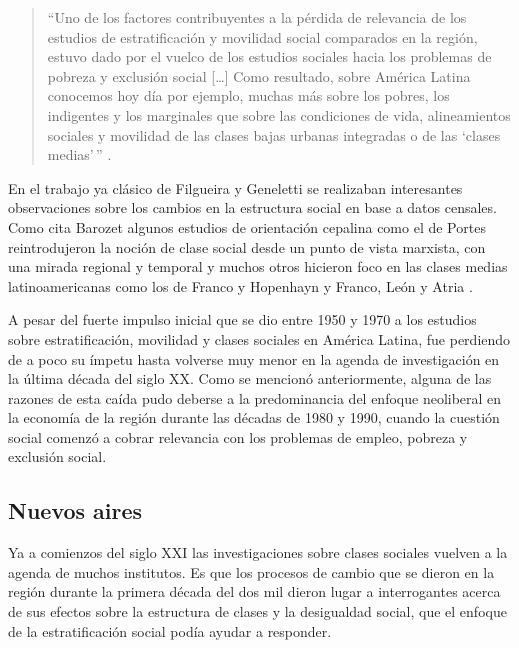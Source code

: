 \documentclass[
]{book}
\begin{document}
\begin{quote}
``Uno de los factores contribuyentes a la pérdida de relevancia de los estudios de estratificación y movilidad social comparados en la región, estuvo dado por el vuelco de los estudios sociales hacia los problemas de pobreza y exclusión social {[}\ldots{]} Como resultado, sobre América Latina conocemos hoy día por ejemplo, muchas más sobre los pobres, los indigentes y los marginales que sobre las condiciones de vida, alineamientos sociales y movilidad de las clases bajas urbanas integradas o de las `clases medias'\,'' \citeyearpar[p.~8]{Filgueira2001}.
\end{quote}

En el trabajo ya clásico de Filgueira y Geneletti \citeyearpar{Filgueira1981} se realizaban interesantes observaciones sobre los cambios en la estructura social en base a datos censales. Como cita Barozet \citeyearpar{Barozet2007} algunos estudios de orientación cepalina como el de Portes \citeyearpar{Portes2003} reintrodujeron la noción de clase social desde un punto de vista marxista, con una mirada regional y temporal y muchos otros hicieron foco en las clases medias latinoamericanas como los de Franco y Hopenhayn \citeyearpar{Franco2010} y Franco, León y Atria \citetext{\citeyear{Franco2007}; \citeyear{Franco2010a}}.

A pesar del fuerte impulso inicial que se dio entre 1950 y 1970 a los estudios sobre estratificación, movilidad y clases sociales en América Latina, fue perdiendo de a poco su ímpetu hasta volverse muy menor en la agenda de investigación en la última década del siglo XX. Como se mencionó anteriormente, alguna de las razones de esta caída pudo deberse a la predominancia del enfoque neoliberal en la economía de la región durante las décadas de 1980 y 1990, cuando la cuestión social comenzó a cobrar relevancia con los problemas de empleo, pobreza y exclusión social.

\hypertarget{nuevos-aires}{%
\subsection{Nuevos aires}\label{nuevos-aires}}

Ya a comienzos del siglo XXI las investigaciones sobre clases sociales vuelven a la agenda de muchos institutos. Es que los procesos de cambio que se dieron en la región durante la primera década del dos mil dieron lugar a interrogantes acerca de sus efectos sobre la estructura de clases y la desigualdad social, que el enfoque de la estratificación social podía ayudar a responder.
\end{document}
